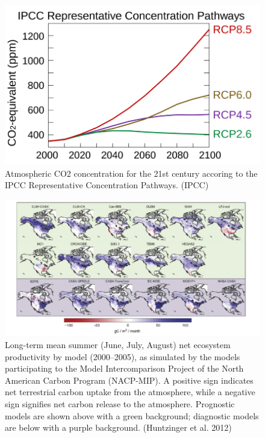 \documentclass[12pt,oneside]{book}
\begin{document}
\begin{figure}

{\centering \includegraphics[width=0.8\linewidth]{figures/chap10/f10_6_RCPs} 

}

\caption{Atmospheric CO2 concentration for the 21st century accoring to the IPCC Representative Concentration Pathways. (IPCC)}\label{fig:f106}
\end{figure}

\begin{figure}

{\centering \includegraphics[width=0.8\linewidth]{figures/chap10/f10_7_huntzinger} 

}

\caption{Long-term mean summer (June, July, August) net ecosystem productivity by model (2000–2005), as simulated by the models participating to the Model Intercomparison Project of the North American Carbon Program (NACP-MIP). A positive sign indicates net terrestrial carbon uptake from the atmosphere, while a negative sign signifies net carbon release to the atmosphere. Prognostic models are shown above with a green background; diagnostic models are below with a purple background. (Huntzinger et al. 2012)}\label{fig:f107}
\end{figure}
\end{document}
